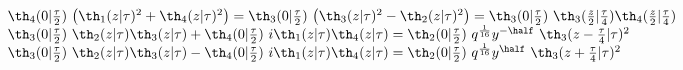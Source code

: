 \begin{equation}
      \begin{array}{l}
 \th_4(0|{\tau\over 2}) ~\big( \th_1(z|\tau)^2 + \th_4(z|\tau)^2 \big) 
= \th_3(0|{\tau\over 2}) ~\big( \th_3(z|\tau)^2 - \th_2(z|\tau)^2 \big) 
= \th_3(0|{\tau\over 2}) ~\th_3({z\over 2}|{\tau\over 4})
\th_4({z\over 2}|{\tau\over 4}) \\
  \th_3(0|{\tau\over 2}) ~\th_2(z|\tau) \th_3(z|\tau) 
+ \th_4(0|{\tau\over 2}) ~i \th_1(z|\tau) \th_4(z|\tau) 
= \th_2(0|{\tau\over 2}) ~q^{1\over 16} y^{-\half}~
\th_3(z-{\tau\over 4}|\tau)^2 \\
  \th_3(0|{\tau\over 2}) ~\th_2(z|\tau) \th_3(z|\tau) 
- \th_4(0|{\tau\over 2}) ~i \th_1(z|\tau) \th_4(z|\tau) 
= \th_2(0|{\tau\over 2}) ~q^{1\over 16} y^\half ~
\th_3(z+{\tau\over 4}|\tau)^2 
  \end{array}
  \end{equation}


